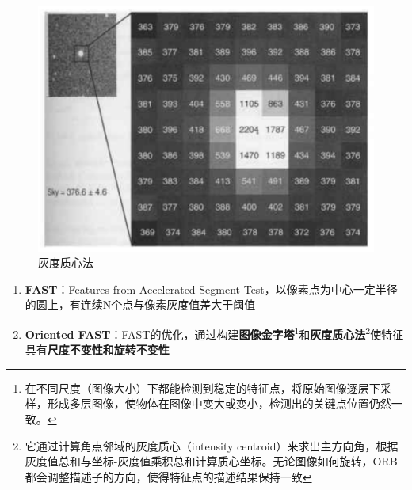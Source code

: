 \documentclass[../main.tex]{subfiles}
\begin{document}
\begin{enumerate}
\begin{itemize}
\begin{enumerate}
\begin{itemize}
\begin{itemize}
\begin{itemize}
\begin{figure}[H]
\begin{minipage}[t]{0.35\textwidth}
                                                        \includegraphics[width=\textwidth]{images/orb3.png}
                                                        \caption{灰度质心法}
                                                        \label{fig:orb_centroid}
                                                    \end{minipage}
                                                \end{figure}
                                                \begin{enumerate}
                                                    \item \textbf{FAST}：Features from Accelerated Segment Test，以像素点为中心一定半径的圆上，有连续N个点与像素灰度值差大于阈值
                                                    \item \textbf{Oriented FAST}：FAST的优化，通过构建\textbf{图像金字塔}\footnote{在不同尺度（图像大小）下都能检测到稳定的特征点，将原始图像逐层下采样，形成多层图像，使物体在图像中变大或变小，检测出的关键点位置仍然一致。}和\textbf{灰度质心法}\footnote{它通过计算角点邻域的灰度质心（intensity centroid）来求出主方向角，根据灰度值总和与坐标-灰度值乘积总和计算质心坐标。无论图像如何旋转，ORB都会调整描述子的方向，使得特征点的描述结果保持一致}使特征具有\textbf{尺度不变性和旋转不变性}
                                                \end{enumerate}


\end{itemize}
\end{itemize}
\end{itemize}
\end{enumerate}
\end{itemize}
\end{enumerate}
\end{document}
